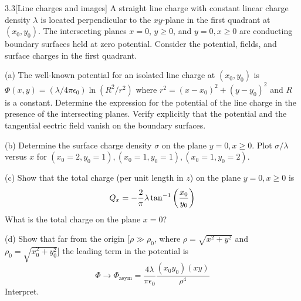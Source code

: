 \documentclass[12pt]{article}
\begin{document}
\begin{problem}{3.3}[Line charges and images]
A straight line charge with constant linear charge density $\lambda$ is located
perpendicular to the $xy$-plane in the first quadrant at $(x_0,y_0)$. The
intersecting planes $x=0$, $y\geq0$, and $y=0,x\geq0$ are conducting boundary
surfaces held at zero potential. Consider the potential, fields, and surface
charges in the first quadrant.

(a) The well-known potential for an isolated line charge at $(x_0,y_0)$ is
$\Phi(x,y)=(\lambda/4\pi\epsilon_0)\ln(R^2/r^2)$ where $r^2=(x-x_0)^2+(y-y_0)^2$
and $R$ is a constant. Determine the expression for the potential of the line
charge in the presence of the intersecting planes. Verify explicitly that the
potential and the tangential eectric field vanish on the boundary surfaces.

(b) Determine the surface charge density $\sigma$ on the plane $y=0,x\geq0$.
Plot $\sigma/\lambda$ versus $x$ for
$(x_0=2,y_0=1),(x_0=1,y_0=1),(x_0=1,y_0=2)$.

(c) Show that the total charge (per unit length in $z$) on the plane $y=0,x\geq
0$ is
\begin{equation}
    Q_x=-\frac2\pi\lambda\tan^{-1}\qty(\frac{x_0}{y_0}) 
\end{equation}
What is the total charge on the plane $x=0$?

(d) Show that far from the origin [$\rho\gg\rho_0$, where $\rho=\sqrt{x^2+y^2}$
and $\rho_0=\sqrt{x_0^2+y_0^2}$] the leading term in the potential is
\begin{equation}
    \Phi\to\Phi_{\text{asym}}=\frac{4\lambda}{\pi\epsilon_0}\frac{(x_0y_0)(xy)}{\rho^4} 
\end{equation}
Interpret.
\end{problem}
\end{document}
